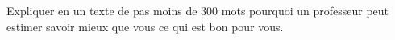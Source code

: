 
\begin{exercice}\label{exosmath-0446}

    Expliquer en un texte de pas moins de \( 300\) mots pourquoi un professeur peut estimer savoir mieux que vous ce qui est bon pour vous.

\end{exercice}
